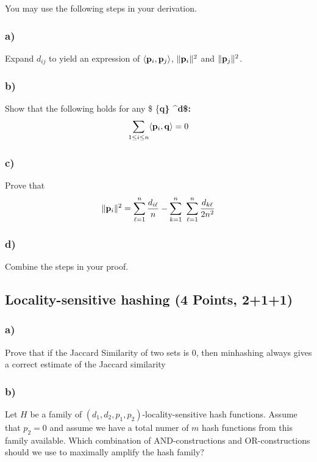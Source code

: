 \documentclass[11pt]{article}
\begin{document}
You may use the following steps in your derivation.

\subsubsection{a)}\label{a}

Expand \(d_{ij}\) to yield an expression of
\(\langle {\bf p}_i, {\bf p}_j \rangle\), \(\|{\bf p}_i\|^2\) and
\(\|{\bf p}_j\|^2\).

\subsubsection{b)}\label{b}

Show that the following holds for any \$ \{\bf q\}
\in {}\^{}d\$:
\[ \sum_{1 \leq i \leq n} \langle {\bf p}_i , {\bf q} \rangle =   0\]

\subsubsection{c)}\label{c}

Prove that
\[ \|{\bf p}_i\|^2 = \sum_{\ell=1}^{n} \frac{d_{i\ell}}{n} - \sum_{k=1}^{n}~ \sum_{\ell=1}^{n} \frac{d_{k\ell}}{2n^2}\]

\subsubsection{d)}\label{d}

Combine the steps in your proof.

    \subsection{Locality-sensitive hashing (4 Points,
2+1+1)}\label{locality-sensitive-hashing-4-points-211}

\subsubsection{a)}\label{a}

Prove that if the Jaccard Similarity of two sets is \(0\), then
minhashing always gives a correct estimate of the Jaccard similarity

\subsubsection{b)}\label{b}

Let \(H\) be a family of \((d_1,d_2,p_1,p_2)\)-locality-sensitive hash
functions. Assume that \(p_2=0\) and assume we have a total numer of
\(m\) hash functions from this family available. Which combination of
AND-constructions and OR-constructions should we use to maximally
amplify the hash family?
\end{document}

